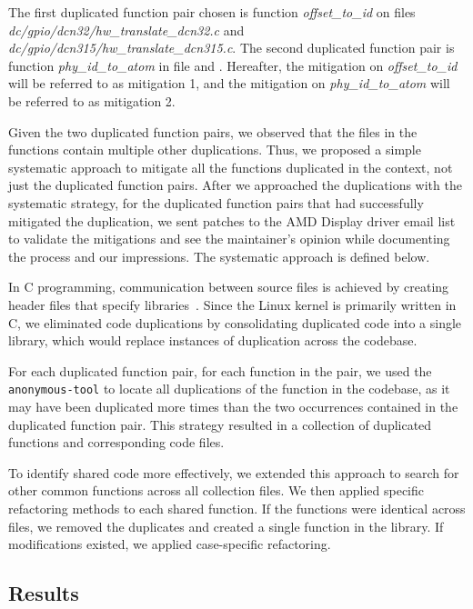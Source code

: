 \documentclass[12pt]{article}
\begin{document}
The first duplicated function pair chosen is function \textit{offset\_to\_id} on files \textit{dc/gpio/dcn32/hw\_translate\_dcn32.c} and \textit{dc/gpio/dcn315/hw\_translate\_dcn315.c}. The second duplicated function pair is function \textit{phy\_id\_to\_atom} in file 
\textit{ } and \textit{}.
Hereafter, the mitigation on \textit{offset\_to\_id} will be referred to as mitigation 1, and the mitigation on 
\textit{phy\_id\_to\_atom} will be referred to as mitigation 2.



Given the two duplicated function pairs, we observed that the files in the functions 
contain multiple other duplications. Thus, we proposed a simple systematic approach 
to mitigate all the functions duplicated in the context, not just the duplicated 
function pairs. 
After we approached the duplications with the systematic strategy, for the duplicated 
function pairs that had successfully mitigated the duplication, we sent patches to the 
AMD Display driver email list to validate the mitigations and see the maintainer's opinion 
while documenting the process and our impressions.
The systematic approach is defined below. 

In C programming, communication between source files is achieved by creating header files that specify 
libraries~\cite{Cbook}. Since the Linux kernel is primarily written in C, we eliminated code duplications 
by consolidating duplicated code into a single library, which would replace instances of 
duplication across the codebase.

For each duplicated function pair, for each function in the pair, we used the \texttt{anonymous-tool} to locate all duplications of the function in the codebase, as it may have been duplicated more times than the two occurrences contained in the duplicated function pair. 
This strategy resulted in a collection of duplicated functions and corresponding code files.

To identify shared code more effectively, we extended this approach to search for other common 
functions across all collection files. We then applied specific refactoring methods to each shared 
function. If the functions were identical across files, we removed the duplicates and created a single 
function in the library. If modifications existed, we applied case-specific refactoring.

\subsection{Results}
\label{subsec:participantresults}
\end{document}
